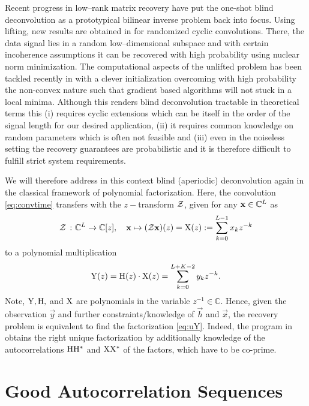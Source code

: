 \documentclass[conference]{IEEEtran}
\begin{document}
Recent progress in low--rank matrix recovery have put the one-shot blind deconvolution as a prototypical bilinear
inverse problem back into focus. Using lifting, new results are obtained in \cite{Ahmed:2012} for randomized cyclic
convolutions. There, the data signal lies in a random low--dimensional subspace and with certain incoherence assumptions
it can be recovered with high probability using nuclear norm minimization.  The computational aspects of the unlifted
problem has been tackled recently in \cite{Li2016} with a clever initialization overcoming with high probability the
non-convex nature such that gradient based algorithms will not stuck in a local minima.  Although this renders blind
deconvolution tractable in theoretical terms this (i) requires cyclic extensions which can be itself in the order of the
signal length for our desired application, (ii) it requires common knowledge on random parameters which is often not
feasible and (iii) even in the noiseless setting the recovery guarantees are probabilistic and it is therefore difficult
to fulfill strict system requirements.

We will therefore address in this context blind (aperiodic) deconvolution again in the classical framework of
polynomial factorization. Here, the convolution \eqref{eq:convtime} transfers with the $z-$transform ${\mathcal Z}$, given for any
${\mathbf x}\in{\ensuremath{\mathbb C}}^L$ as
%
\begin{align*}
  {\ensuremath{\mathcal Z}}\ \colon {\ensuremath{\mathbb C}}^L \to {\ensuremath{\mathbb C}}[z], \quad 
  {\ensuremath{\mathbf x}}\mapsto({\mathcal Z}{\mathbf x})(z)={\mathrm X}(z):=\sum_{k=0}^{L-1} x_k z^{-k}
\end{align*}
%
to a polynomial multiplication 
\begin{equation}
  \vspace*{-.0em}
  \uY(z)=\uH(z)\cdot \uX(z)=\sum_{k=0}^{L+K-2} y_k z^{-k}.\label{eq:uY}
  \vspace*{-.0em}
\end{equation}
%
Note, ${\mathrm Y}, {\mathrm H},$ and ${\mathrm X}$ are polynomials in the variable $z^{-1}\in\mathbb{C}$.  Hence, given the
observation $\vec{y}$ and further constraints/knowledge of $\vec{h}$ and $\vec{x}$, the recovery problem is equivalent
to find the factorization \eqref{eq:uY}. Indeed, the program in \cite{JH16} obtains the right unique factorization by
additionally knowledge of the autocorrelations ${\mathrm H}{\mathrm H}^*$ and ${\mathrm X}{\mathrm X}^*$ of the factors, which have to be co-prime. 

\section{Good Autocorrelation Sequences}\label{sec:goodautocorrelation}
\end{document}
